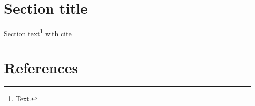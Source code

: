 \documentclass[11pt,a4paper]{article}
\begin{document}
\setlength{\parskip}{0pt}
    {
        \hypersetup{
            hidelinks=true
        }
        \tableofcontents
    }
\setlength{\parskip}{0pt}

\newpage

\section{Section title}

Section text\footnote{Text.} with cite~\cite{BOOK}.

\newpage

\section{References}

\begin{flushleft}
    
\end{flushleft}
\end{document}
